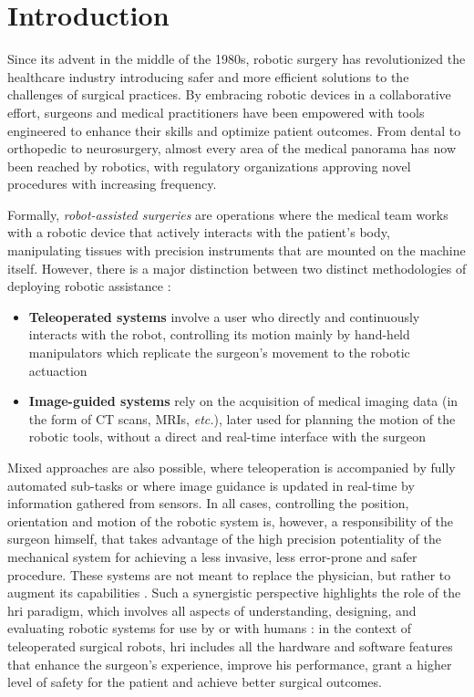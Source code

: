 \documentclass[../main.tex]{subfiles}
\begin{document}
\section{Introduction}
Since its advent in the middle of the 1980s, robotic surgery has revolutionized the healthcare industry introducing safer and more efficient solutions to the challenges of surgical practices. By embracing robotic devices in a collaborative effort, surgeons and medical practitioners have been empowered with tools engineered to enhance their skills and optimize patient outcomes. 
From dental to orthopedic to neurosurgery, almost every area of the medical panorama has now been reached by robotics, with regulatory organizations approving novel procedures with increasing frequency.

Formally, \textit{robot-assisted surgeries} are operations where the medical team works with a robotic device that actively interacts with the patient's body, manipulating tissues with precision instruments that are mounted on the machine itself. 
However, there is a major distinction between two distinct methodologies of deploying robotic assistance \cite{Hoeckelmann2015}:
\begin{itemize}
    \item \textbf{Teleoperated systems} involve a user who directly and continuously interacts with the robot, controlling its motion mainly by hand-held manipulators which replicate the surgeon's movement to the robotic actuaction
    \item \textbf{Image-guided systems} rely on the acquisition of medical imaging data (in the form of CT scans, MRIs, \textit{etc.}), later used for planning the motion of the robotic tools, without a direct and real-time interface with the surgeon
\end{itemize}
Mixed approaches are also possible, where teleoperation is accompanied by fully automated sub-tasks or where image guidance is updated in real-time by information gathered from sensors. 
In all cases, controlling the position, orientation and motion of the robotic system is, however, a responsibility of the surgeon himself, that takes advantage of the high precision potentiality of the mechanical system for achieving a less invasive, less error-prone and safer procedure. These systems are not meant to replace the physician, but rather to augment its capabilities \cite{Cleary2001}. Such a synergistic perspective highlights the role of the \ac{hri} paradigm, which involves all aspects of understanding, designing, and evaluating robotic systems for use by or with humans \cite{Goodrich2007}: in the context of teleoperated surgical robots, \ac{hri} includes all the hardware and software features that enhance the surgeon's experience, improve his performance, grant a higher level of safety for the patient and achieve better surgical outcomes.
\end{document}
